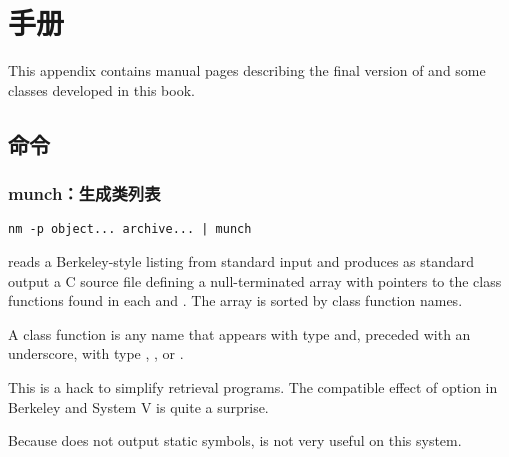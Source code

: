 

\chapter{手册}
This appendix contains  manual pages describing the final version
of  and some classes developed in this book.

\section{命令}

\subsection{munch：生成类列表}
\begin{lstlisting}[keywords={nm,munch}]
	nm -p object... archive... | munch
\end{lstlisting}
 reads a Berkeley-style  listing from standard
input and produces as standard output a C source file defining a
null-terminated array  with pointers to the class functions
found in each  and . The array is sorted by
class function names.

A class function is any name that appears with type  and, preceded
with an underscore, with type , , or .

This is a hack to simplify retrieval programs. The compatible effect of
option  in Berkeley and System V  is quite a surprise.

Because   does not output static symbols,
 is not very useful on this system.

